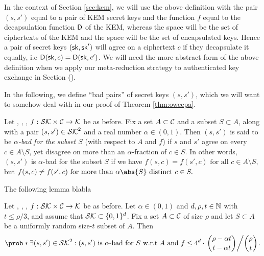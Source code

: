 In the context of Section \ref{sec:kem},
we will use the above definition with the pair \((s,s')\)
equal to a pair of KEM secret keys and the function \(f\)
equal to the decapsulation function \(\mathsf{D}\) of the KEM,
whereas the space \setC will be the set of ciphertexts of the KEM
and the space \keyspace will be the set of encapsulated keys.
Hence a pair of secret keys \((\mathsf{sk},\mathsf{sk}')\) will agree on a ciphertext \(c\)
if they decapsulate it equally, i.e \(\mathsf{D}(\mathsf{sk},c) = \mathsf{D}(\mathsf{sk},c')\).
We will need the more abstract form of the above definition
when we apply our meta-reduction strategy to authenticated key exchange in Section ().

In the following, we define ``bad pairs'' of secret keys \((s,s')\),
which we will want to somehow deal with in our proof of Theorem \ref{thm:owecpa}.

\begin{definition}\label{def:bad}
  Let \setSK, \setC, \keyspace, \(f : \mathcal{SK} \times \mathcal{C} \to \mathcal{K}\) be as before.
  Fix a set \(A \subset \mathcal{C}\) and a subset \(S \subset A\),
  along with a pair \((s,s') \in \mathcal{SK}^{2}\) and a real number \(\alpha \in (0,1)\).
  Then \((s,s')\) is said to be \emph{\(\alpha\)-bad for the subset \(S\)} (with respect to \(A\) and \(f\)) if
  \(s\) and \(s'\) agree on every \(c \in A \setminus S\), yet disagree on more than an \(\alpha\)-fraction of \(c \in S\).
  In other words, \((s,s')\) is \(\alpha\)-bad for the subset \(S\) if we have
  \(
    f(s,c) = f(s',c) \text{ for all } c \in A \setminus S,
  \)
  but
  \(
    f(s,c) \ne f(s',c) \text{ for more than } \alpha \abs{S} \text{ distinct } c \in S.
  \)
\end{definition}

The following lemma blabla 

\begin{lemma}\label{lemma:equiv}
  Let \setSK, \setC, \keyspace, \(f : \mathcal{SK} \times \mathcal{C} \to \mathcal{K}\) be as before.
  Let \(\alpha \in (0,1)\) and \(d,\rho,t \in \mathbb{N}\) with \(t \le \rho/3\),
  and assume that \(\mathcal{SK} \subset \{0,1\}^{d}\).
  Fix a set \(A \subset \mathcal{C}\) of size \(\rho\)
  and let \(S \subset A\) be a uniformly random size-\(t\) subset of \(A\).
  Then
  \begin{align}\label{ineq:equiv}
    \prob*{\exists (s,s') \in \setSK^{2} : (s,s') \text{ is \(\alpha\)-bad for } S \text{ w.r.t \(A\) and \(f\)}}
    \le 4^{d} \cdot \left. \binom{\rho - \alpha t}{t - \alpha t} \middle/ \binom{\rho}{t} \right..
  \end{align}
\end{lemma}

